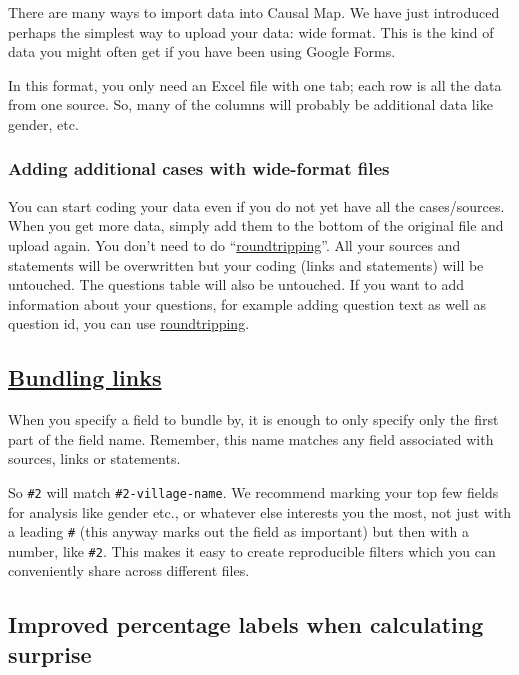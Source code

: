 \documentclass[
]{book}
\begin{document}
There are many ways to import data into Causal Map. We have just introduced perhaps the simplest way to upload your data: wide format. This is the kind of data you might often get if you have been using Google Forms.

In this format, you only need an Excel file with one tab; each row is all the data from one source. So, many of the columns will probably be additional data like gender, etc.

\hypertarget{adding-additional-cases-with-wide-format-files-1}{%
\subsubsection{Adding additional cases with wide-format files}\label{adding-additional-cases-with-wide-format-files-1}}

You can start coding your data even if you do not yet have all the cases/sources. When you get more data, simply add them to the bottom of the original file and upload again. You don't need to do ``\protect\hyperlink{xroundtripping}{roundtripping}''. All your sources and statements will be overwritten but your coding (links and statements) will be untouched. The questions table will also be untouched. If you want to add information about your questions, for example adding question text as well as question id, you can use \protect\hyperlink{xroundtripping}{roundtripping}.

\hypertarget{bundling-links}{%
\subsection{\texorpdfstring{\protect\hyperlink{bundlelinks}{Bundling links}}{Bundling links}}\label{bundling-links}}

When you specify a field to bundle by, it is enough to only specify only the first part of the field name. Remember, this name matches any field associated with sources, links or statements.

So \texttt{\#2} will match \texttt{\#2-village-name}. We recommend marking your top few fields for analysis like gender etc., or whatever else interests you the most, not just with a leading \texttt{\#} (this anyway marks out the field as important) but then with a number, like \texttt{\#2}. This makes it easy to create reproducible filters which you can conveniently share across different files.

\hypertarget{improved-percentage-labels-when-calculating-surprise}{%
\subsection{Improved percentage labels when calculating surprise}\label{improved-percentage-labels-when-calculating-surprise}}
\end{document}
